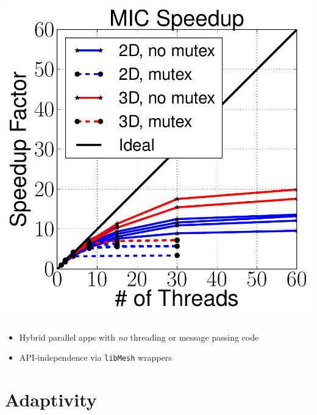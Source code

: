 \documentclass[mathserif]{beamer}
\newcommand{\libMesh}{\texttt{libMesh}\xspace}
\begin{document}
\begin{frame}
\begin{columns}
\center
\includegraphics[width=.8\textwidth]{threaded_speedup}

\end{columns}

\begin{itemize}
	\item Hybrid parallel apps with {\emph{no}}
		threading or message passing code
	\item API-independence via \libMesh{} wrappers
\end{itemize}
\end{frame}




\section{Adaptivity}
\end{document}
